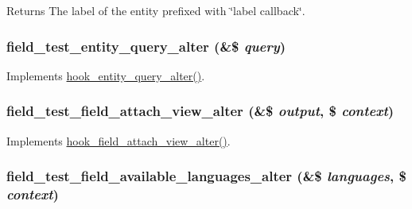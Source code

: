 \begin{DoxyReturn}{Returns}
The label of the entity prefixed with \char`\"{}label callback\char`\"{}. 
\end{DoxyReturn}
\hypertarget{field__test_8module_a2d15737af11f252dd9227af814f0f2b1}{
\subsubsection[{field\_\-test\_\-entity\_\-query\_\-alter}]{\setlength{\rightskip}{0pt plus 5cm}field\_\-test\_\-entity\_\-query\_\-alter (\&\$ {\em query})}}
\label{field__test_8module_a2d15737af11f252dd9227af814f0f2b1}
Implements \hyperlink{group__hooks_ga22d97ef7297e17697cdaa8b32483f412}{hook\_\-entity\_\-query\_\-alter()}. \hypertarget{field__test_8module_ab4836ef0c380beae6ac246620f3c3b9b}{
\subsubsection[{field\_\-test\_\-field\_\-attach\_\-view\_\-alter}]{\setlength{\rightskip}{0pt plus 5cm}field\_\-test\_\-field\_\-attach\_\-view\_\-alter (\&\$ {\em output}, \/  \$ {\em context})}}
\label{field__test_8module_ab4836ef0c380beae6ac246620f3c3b9b}
Implements \hyperlink{group__field__attach_ga0c415aacfd70903f556fb67517dfe1ee}{hook\_\-field\_\-attach\_\-view\_\-alter()}. \hypertarget{field__test_8module_a0a6f85b074751f24280d72b415dab142}{
\subsubsection[{field\_\-test\_\-field\_\-available\_\-languages\_\-alter}]{\setlength{\rightskip}{0pt plus 5cm}field\_\-test\_\-field\_\-available\_\-languages\_\-alter (\&\$ {\em languages}, \/  \$ {\em context})}}
